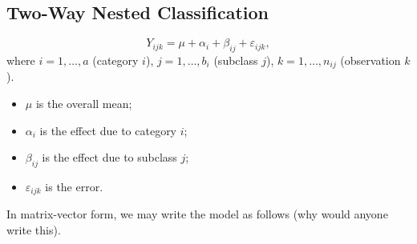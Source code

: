 \subsection*{Two-Way Nested Classification}
\[ Y_{ijk}=\mu+\alpha_i+\beta_{ij}+\varepsilon_{ijk}, \]
where $ i=1,\ldots,a $ (category $ i $), $ j=1,\ldots,b_i $ (subclass $ j $),
$ k=1,\ldots,n_{ij} $ (observation $ k $).
\begin{itemize}
    \item $ \mu $ is the overall mean;
    \item $ \alpha_i $ is the effect due to category $ i $;
    \item $ \beta_{ij} $ is the effect due to subclass $ j $;
    \item $ \varepsilon_{ijk} $ is the error.
\end{itemize}
In matrix-vector form, we may write the model as follows (why would anyone write this).
